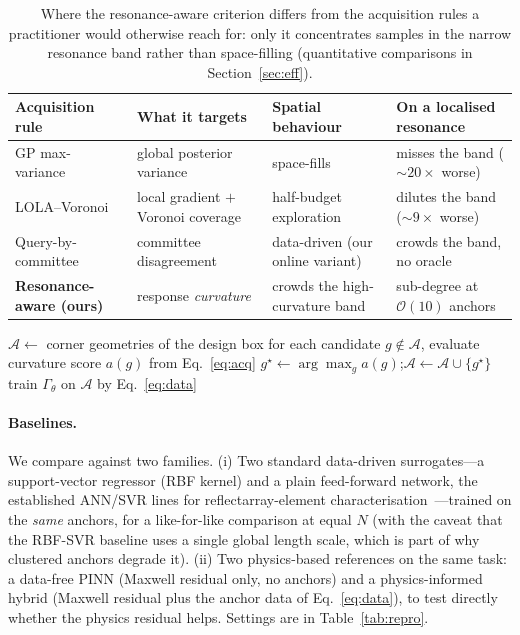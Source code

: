\documentclass[11pt]{article}
\begin{document}
\begin{table}[!ht]\centering
\caption{Where the resonance-aware criterion differs from the acquisition rules a practitioner would
otherwise reach for: only it concentrates samples in the narrow resonance band rather than space-filling
(quantitative comparisons in Section~\ref{sec:eff}).}
\label{tab:acqcompare}
\small
\begin{tabular}{@{}p{3.0cm}p{3.1cm}p{3.0cm}p{3.4cm}@{}}
\toprule
Acquisition rule & What it targets & Spatial behaviour & On a localised resonance \\
\midrule
GP max-variance~\cite{settles2012} & global posterior variance & space-fills & misses the band ($\sim\!20\times$ worse) \\
LOLA--Voronoi~\cite{crombecq2011} & local gradient $+$ Voronoi coverage & half-budget exploration & dilutes the band ($\sim\!9\times$ worse) \\
Query-by-committee~\cite{settles2012} & committee disagreement & data-driven (our online variant) & crowds the band, no oracle \\
\textbf{Resonance-aware (ours)} & response \emph{curvature} & crowds the high-curvature band & sub-degree at $\mathcal{O}(10)$ anchors \\
\bottomrule
\end{tabular}
\end{table}

\begin{algorithm}[!ht]
\caption{Resonance-aware active sampling}\label{alg:active}
\begin{algorithmic}[1]
\State $\mathcal{A}\gets$ corner geometries of the design box
\State for each candidate $g\notin\mathcal{A}$, evaluate curvature score $a(g)$ from Eq.~\eqref{eq:acq}
\State $g^\star\gets\arg\max_g a(g)$;\quad $\mathcal{A}\gets\mathcal{A}\cup\{g^\star\}$
\EndWhile
\State train $\Gamma_\theta$ on $\mathcal{A}$ by Eq.~\eqref{eq:data}
\end{algorithmic}
\end{algorithm}

\paragraph{Baselines.} We compare against two families. (i) Two standard data-driven surrogates---a
support-vector regressor (RBF kernel) and a plain feed-forward network, the established ANN/SVR lines for
reflectarray-element characterisation~\cite{robustillo2012,prado2018}---trained on the \emph{same}
anchors, for a like-for-like comparison at equal $N$ (with the caveat that the RBF-SVR baseline uses a
single global length scale, which is part of why clustered anchors degrade it). (ii) Two physics-based references on the same
task: a data-free PINN (Maxwell residual only, no anchors) and a physics-informed hybrid (Maxwell
residual plus the anchor data of Eq.~\eqref{eq:data}), to test directly whether the physics residual
helps. Settings are in Table~\ref{tab:repro}.
\end{document}
